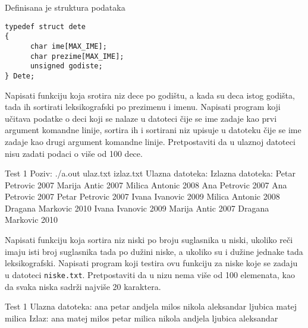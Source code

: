 \begin{Exercise}[label=508]
  Definisana je struktura podataka
\begin{verbatim}
typedef struct dete
{
      char ime[MAX_IME];
      char prezime[MAX_IME];
      unsigned godiste;
} Dete;
\end{verbatim}
Napisati funkciju koja srotira niz dece po godištu, a kada su deca
istog godišta, tada ih sortirati leksikografski po prezimenu i
imenu. Napisati program koji učitava podatke o deci koji se nalaze
u datoteci čije se ime zadaje kao prvi argument komandne linije,
sortira ih i sortirani niz upisuje u datoteku čije se ime zadaje
kao drugi argument komandne linije. Pretpostaviti da u ulaznoj
datoteci nisu zadati podaci o više od 100 dece.
  
\begin{maxitest}
\begin{test}{Test 1}
Poziv: ./a.out ulaz.txt izlaz.txt
Ulazna datoteka:                 Izlazna datoteka:
Petar Petrovic 2007              Marija Antic 2007
Milica Antonic 2008              Ana Petrovic 2007
Ana Petrovic 2007                Petar Petrovic 2007
Ivana Ivanovic 2009              Milica Antonic 2008
Dragana Markovic 2010            Ivana Ivanovic 2009
Marija Antic 2007                Dragana Markovic 2010
\end{test}
\end{maxitest}
  
\end{Exercise}

\begin{Exercise}[label=509]
  Napisati funkciju koja sortira niz niski po broju suglasnika u
  niski, ukoliko reči imaju isti broj suglasnika tada po
  du\v{z}ini niske, a ukoliko su i du\v{z}ine jednake tada
  leksikografski.  Napisati program koji testira ovu funkciju za niske
  koje se zadaju u datoteci \verb|niske.txt|.  Pretpostaviti da u nizu
  nema više od 100 elemenata, kao da svaka niska sadr\v{z}i
  najviše 20 karaktera.
  
\begin{maxitest}
\begin{test}{Test 1}
Ulazna datoteka:
ana petar andjela milos nikola aleksandar ljubica matej milica
Izlaz:
ana matej milos petar milica nikola andjela ljubica aleksandar
\end{test}
\end{maxitest}
  
\end{Exercise}

